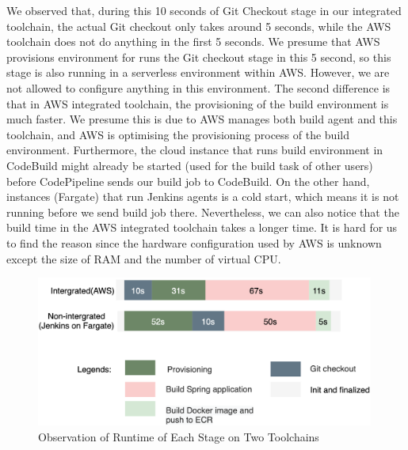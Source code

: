 \par
 We observed that, during this 10 seconds of Git Checkout stage in our integrated toolchain, the actual Git checkout only takes around 5 seconds, while the AWS toolchain does not do anything in the first 5 seconds. We presume that AWS provisions environment for runs the Git checkout stage in this 5 second, so this stage is also running in a serverless environment within AWS. However, we are not allowed to configure anything in this environment.
 The second difference is that in AWS integrated toolchain, the provisioning of the build environment is much faster. We presume this is due to  AWS manages both build agent and this toolchain, and AWS is optimising the provisioning process of the build environment. Furthermore, the cloud instance that runs build environment in CodeBuild might already be started (used for the build task of other users) before CodePipeline sends our build job to CodeBuild. On the other hand, instances (Fargate) that run Jenkins agents is a cold start, which means it is not running before we send build job there.
 Nevertheless, we can also notice that the build time in the AWS integrated toolchain takes a longer time. It is hard for us to find the reason since the hardware configuration used by AWS is unknown except the size of RAM and the number of virtual CPU.
\begin{figure}[h]
    \centering
    \includegraphics[width=0.99\textwidth]{pics/stages.png}
    \caption{Observation of Runtime of Each Stage on Two Toolchains}
    \label{fig:stage_runtime}
    \end{figure}
 \par
